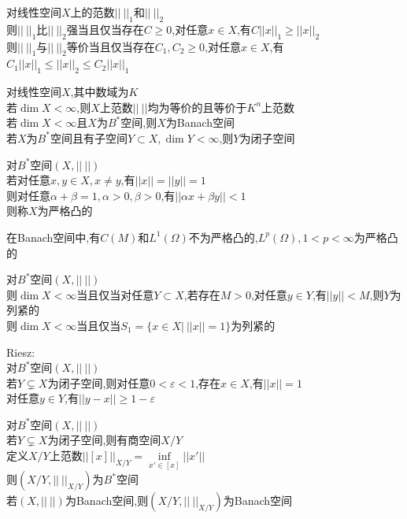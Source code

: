 \begin{dingli}
对线性空间$X$上的范数$||\ ||_{1}$和$||\ ||_{2}$\\
则$||\ ||_{1}$比$||\ ||_{2}$强当且仅当存在$C\geq 0$,对任意$x\in X$,有$C||x||_{1}\geq ||x||_{2}$\\
则$||\ ||_{1}$与$||\ ||_{2}$等价当且仅当存在$C_1,C_2\geq 0$,对任意$x\in X$,有$C_1||x||_{1}\leq ||x||_{2}\leq C_2||x||_{1}$
\end{dingli}

\begin{dingli}
对线性空间$X$,其中数域为$K$\\
若$\dim X<\infty$,则$X$上范数$||\ ||$均为等价的且等价于$K^n$上范数\\
若$\dim X<\infty$且$X$为$B^*$空间,则$X$为Banach空间\\
若$X$为$B^*$空间且有子空间$Y\subset X,\dim Y<\infty$,则$Y$为闭子空间
\end{dingli}

\begin{dingyi}
对$B^*$空间$(X,||\ ||)$\\
若对任意$x,y\in X,x\neq y$,有$||x||=||y||=1$\\
则对任意$\alpha+\beta=1,\alpha>0,\beta>0$,有$||\alpha x+\beta y||<1$\\
则称$X$为严格凸的
\end{dingyi}

\begin{zhu}
在Banach空间中,有$C(M)$和$L^1(\Omega)$不为严格凸的,$L^p(\Omega),1<p<\infty$为严格凸的
\end{zhu}

\begin{dingli}
对$B^*$空间$(X,||\ ||)$\\
则$\dim X<\infty$当且仅当对任意$Y\subset X$,若存在$M>0$,对任意$y\in Y$,有$||y||<M$,则$Y$为列紧的\\
则$\dim X<\infty$当且仅当$S_1=\{x\in X|\ ||x||=1\}$为列紧的
\end{dingli}

\begin{dingli}
Riesz:\\
对$B^*$空间$(X,||\ ||)$\\
若$Y\subsetneq X$为闭子空间,则对任意$0<\varepsilon<1$,存在$x\in X$,有$||x||=1$\\
对任意$y\in Y$,有$||y-x||\geq 1-\varepsilon$
\end{dingli}

\begin{dingli}
对$B^*$空间$(X,||\ ||)$\\
若$Y\subsetneq X$为闭子空间,则有商空间$X/Y$\\
定义$X/Y$上范数$||[x]||_{X/Y}=\inf\limits_{x'\in [x]}||x'||$\\
则$(X/Y,||\ ||_{X/Y})$为$B^*$空间\\
若$(X,||\ ||)$为Banach空间,则$(X/Y,||\ ||_{X/Y})$为Banach空间
\end{dingli}

